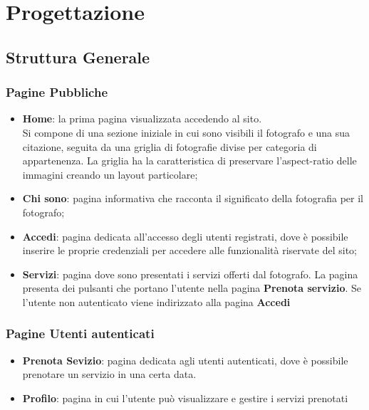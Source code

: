 \section{Progettazione}
\subsection{Struttura Generale}
\subsubsection{Pagine Pubbliche}
\begin{itemize}
    \item \textbf{Home}: la prima pagina visualizzata accedendo al sito.\\
    Si compone di una sezione iniziale in cui sono visibili il fotografo e una sua citazione, seguita da una 
    griglia di fotografie divise per categoria di appartenenza. La griglia ha la caratteristica di 
    preservare l'aspect-ratio delle immagini creando un layout particolare;
    \item \textbf{Chi sono}: pagina informativa che racconta il significato della fotografia per il fotografo;
    \item \textbf{Accedi}: pagina dedicata all'accesso degli utenti registrati, dove è possibile inserire le proprie 
    credenziali per accedere alle funzionalità riservate del sito;
    \item \textbf{Servizi}: pagina dove sono presentati i servizi offerti dal fotografo. La pagina presenta dei
    pulsanti che portano l'utente nella pagina \textbf{Prenota servizio}. Se l'utente non autenticato viene indirizzato alla
    pagina \textbf{Accedi}
\end{itemize}

\subsubsection{Pagine Utenti autenticati}
\begin{itemize}
\item \textbf{Prenota Sevizio}: pagina dedicata agli utenti autenticati, dove \`e possibile prenotare un servizio in una certa data.
\item \textbf{Profilo}: pagina in cui l'utente può visualizzare e gestire i servizi prenotati
\end{itemize}

